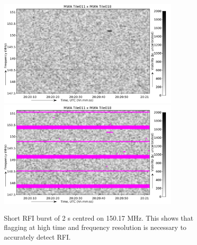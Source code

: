 \documentclass[useAMS,usenatbib]{mn2e}
\begin{document}
\noindent\begin{figure}
\begin{center}\hspace*{-0.2cm}\includegraphics[width=9.1cm]{img/150_2_mhz_example}\includegraphics[width=9.1cm]{img/150_2_mhz_flagged}
\caption{Short RFI burst of 2 s centred on 150.17 MHz. This shows that flagging at high time and frequency resolution is necessary to accurately detect RFI.}
\label{fig:150_2}
\end{center}
\end{figure}
\end{document}
